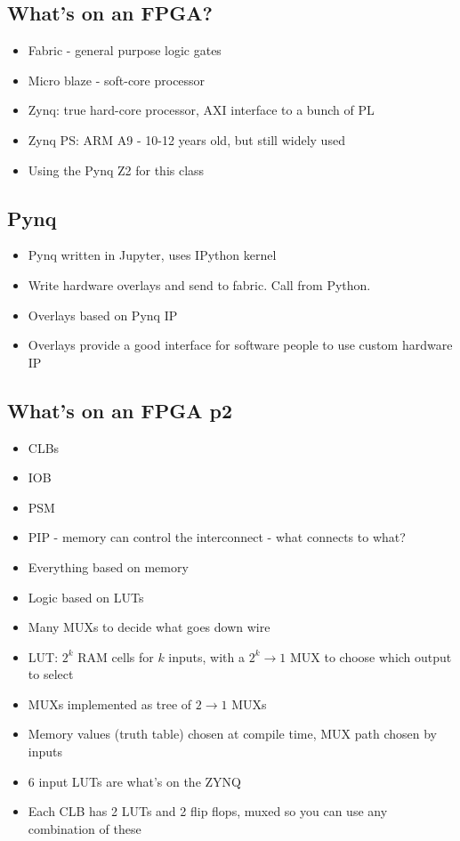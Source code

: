 \documentclass[12pt, letter]{article}
\begin{document}
\subsection*{What's on an FPGA?}
\begin{itemize}
	\item Fabric - general purpose logic gates
	\item Micro blaze - soft-core processor
	\item Zynq: true hard-core processor, AXI interface to a bunch of \ac{PL}
	\item Zynq \ac{PS}: ARM A9 - 10-12 years old, but still widely used
	\item Using the Pynq Z2 for this class
\end{itemize}

\subsection*{Pynq}
\begin{itemize}
	\item Pynq written in Jupyter, uses IPython kernel
	\item Write hardware overlays and send to fabric. Call from Python.
	\item Overlays based on Pynq IP
	\item Overlays provide a good interface for software people to use custom hardware IP
\end{itemize}

\subsection*{What's on an FPGA p2}
\begin{itemize}
	\item \acp{CLB}
	\item \ac{IOB}
	\item \ac{PSM}
	\item \ac{PIP} - memory can control the interconnect - what connects to what?
	\item Everything based on memory
	\item Logic based on \acp{LUT}
	\item Many \acp{MUX} to decide what goes down wire
	\item \ac{LUT}: $2^{k}$ RAM cells for $k$ inputs, with a $2^{k} \to 1$ \ac{MUX} to choose which output to select
	\item \acp{MUX} implemented as tree of $2\to 1$ \acp{MUX}
	\item Memory values (truth table) chosen at compile time, \ac{MUX} path chosen by inputs
	\item 6 input \acp{LUT} are what's on the ZYNQ
	\item Each \ac{CLB} has 2 \acp{LUT} and 2 flip flops, muxed so you can use any combination of these
\end{itemize}
\end{document}
